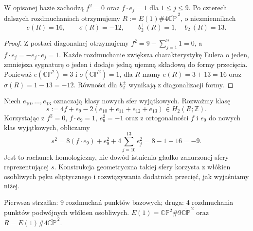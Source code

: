 \begin{lemat}
\label{lem:tg-park-fiber}
W opisanej bazie zachodzą $f^2=0$ oraz $f\cdot e_j=1$
dla $1\le j\le9$. Po czterech dalszych rozdmuchaniach
otrzymujemy $R:=E(1)\#4\overline{\mathbb{CP}}^{\,2}$,
o niezmiennikach
\[
e(R)=16,\qquad \sigma(R)=-12,\qquad
b_2^+(R)=1,\quad b_2^-(R)=13.
\]
\end{lemat}

\begin{proof}
Z postaci diagonalnej otrzymujemy
$f^2=9-\sum_{j=1}^{9}1=0$,
a $f\cdot e_j=-e_j\cdot e_j=1$.
Każde rozdmuchanie zwiększa charakterystykę Eulera
o jeden, zmniejsza sygnaturę o jeden i dodaje jedną
ujemną składową do formy przecięcia. Ponieważ
$e(\mathbb{CP}^{2})=3$ i
$\sigma(\mathbb{CP}^{2})=1$, dla $R$ mamy
$e(R)=3+13=16$ oraz $\sigma(R)=1-13=-12$.
Równości dla $b_2^\pm$ wynikają z diagonalizacji formy.
\end{proof}

\begin{przyklad}
\label{ex:tg-park-S}
Niech $e_{10},\ldots,e_{13}$ oznaczają klasy nowych
sfer wyjątkowych. Rozważmy klasę
\[
s:=4f+e_9-2(e_{10}+e_{11}+e_{12}+e_{13})\in H_2(R;\mathbb Z).
\]
Korzystając z $f^2=0$, $f\cdot e_9=1$,
$e_9^2=-1$ oraz z ortogonalności $f$ i $e_9$ do nowych klas
wyjątkowych, obliczamy
\[
s^2=8(f\cdot e_9)+e_9^2
   +4\sum_{j=10}^{13}e_j^2=8-1-16=-9.
\]
Jest to rachunek homologiczny, nie dowód istnienia
gładko zanurzonej sfery reprezentującej $s$.
Konstrukcja geometryczna takiej sfery korzysta z włókien
osobliwych pęku eliptycznego i rozwiązywania dodatnich
przecięć, jak wyjaśniamy niżej.
\end{przyklad}

\begin{center}

{\footnotesize Pierwsza strzałka: $9$ rozdmuchań punktów bazowych;
druga: $4$ rozdmuchania punktów podwójnych włókien osobliwych.
$E(1)=\mathbb{CP}^{2}\#9\overline{\mathbb{CP}}^{\,2}$ oraz
$R=E(1)\#4\overline{\mathbb{CP}}^{\,2}$.}
\end{center}

